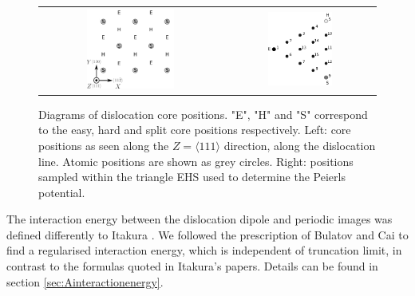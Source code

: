 \documentclass[a4paper,11pt]{article}
\begin{document}
        \begin{figure}
    \begin{tabular}{cc}
	     \includegraphics[width=0.5\textwidth]{Images/hardeasycoreatomdiagram_coordnew.png} &
             \includegraphics[width=0.45\textwidth]{Images/peierls_potential_positions_tbe.png}  \\
    \end{tabular}		
\caption{Diagrams of dislocation core positions. "E", "H" and "S" correspond to the easy, hard and split core positions respectively. Left: core positions as seen along the $Z=\langle 111 \rangle$ direction, along the dislocation line. Atomic positions are shown as grey circles. Right: positions sampled within the triangle EHS used to determine the Peierls potential.  \label{sampledpositions}}
	\label{fig:peierlspot}
    \end{figure}


The interaction energy between the dislocation dipole and periodic images was defined differently
to Itakura \cite{Itakura2012}. We followed the prescription of Bulatov and Cai \cite{vasilybulatov2006} to
find a regularised interaction energy, which is independent of truncation limit, in contrast to
the formulas quoted in Itakura's papers. Details can be found in section \ref{sec:Ainteractionenergy}.
\end{document}

